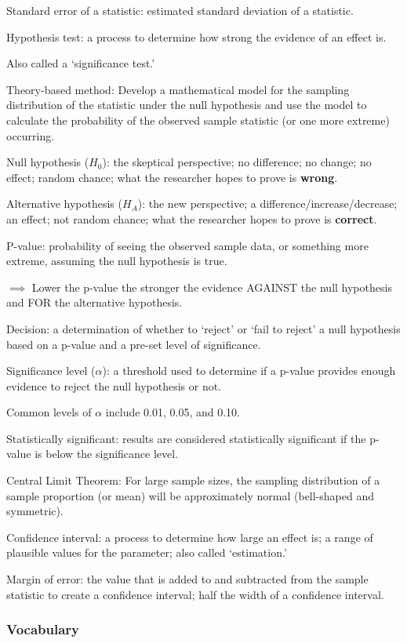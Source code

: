 \documentclass[
]{report}
\newcommand{\rgi}{\hspace{24pt}}  %
\begin{document}
Standard error of a statistic: estimated standard deviation of a statistic.

Hypothesis test: a process to determine how strong the evidence of an effect is.

\rgi Also called a `significance test.'

Theory-based method: Develop a mathematical model for the sampling distribution of the statistic under the null hypothesis and use the model to calculate the probability of the observed sample statistic (or one more extreme) occurring.

Null hypothesis (\(H_0\)): the skeptical perspective; no difference; no change; no effect; random chance; what the researcher hopes to prove is \textbf{wrong}.

Alternative hypothesis (\(H_A\)): the new perspective; a difference/increase/decrease; an effect; not random chance; what the researcher hopes to prove is \textbf{correct}.

P-value: probability of seeing the observed sample data, or something more extreme, assuming the null hypothesis is true.

\(\implies\) Lower the p-value the stronger the evidence AGAINST the null hypothesis and FOR the alternative hypothesis.

Decision: a determination of whether to `reject' or `fail to reject' a null hypothesis based on a p-value and a pre-set level of significance.

Significance level (\(\alpha\)): a threshold used to determine if a p-value provides enough evidence to reject the null hypothesis or not.

\rgi Common levels of \(\alpha\) include 0.01, 0.05, and 0.10.

Statistically significant: results are considered statistically significant if the p-value is below the significance level.

Central Limit Theorem: For large sample sizes, the sampling distribution of a sample proportion (or mean) will be approximately normal (bell-shaped and symmetric).

Confidence interval: a process to determine how large an effect is; a range of plausible values for the parameter; also called `estimation.'

Margin of error: the value that is added to and subtracted from the sample statistic to create a confidence interval; half the width of a confidence interval.

\hypertarget{vocabulary-14}{%
\subsubsection*{Vocabulary}\label{vocabulary-14}}
\end{document}
